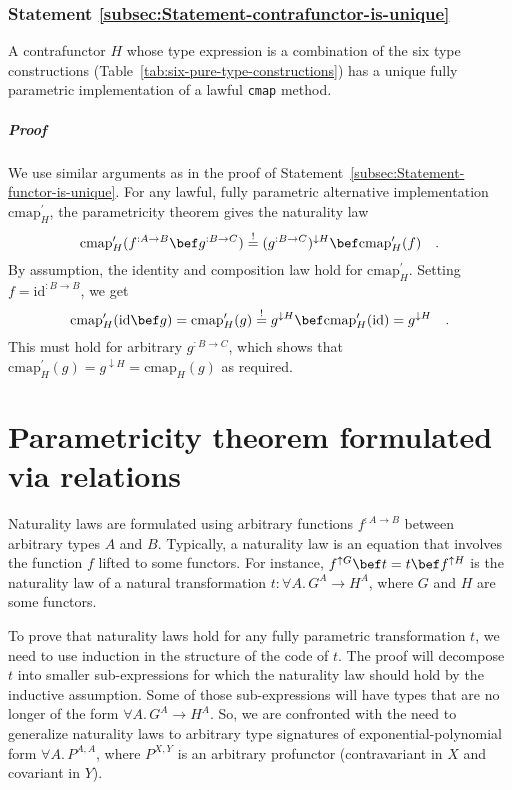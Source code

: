 \subsubsection{Statement \label{subsec:Statement-contrafunctor-is-unique}\ref{subsec:Statement-contrafunctor-is-unique}}

A contrafunctor $H$ whose type expression is a combination of the
six type constructions (Table~\ref{tab:six-pure-type-constructions})
has a unique fully parametric implementation of a lawful \lstinline!cmap!
method. 

\subparagraph{Proof}

We use similar arguments as in the proof of Statement~\ref{subsec:Statement-functor-is-unique}.
For any lawful, fully parametric alternative implementation $\text{cmap}_{H}^{\prime}$,
the parametricity theorem gives the naturality law
\[
\text{cmap}_{H}^{\prime}(f^{:A\rightarrow B}\bef g^{:B\rightarrow C})\overset{!}{=}(g^{:B\rightarrow C})^{\downarrow H}\bef\text{cmap}_{H}^{\prime}(f)\quad.
\]
By assumption, the identity and composition law hold for $\text{cmap}_{H}^{\prime}$.
Setting $f=\text{id}^{:B\rightarrow B}$, we get
\[
\text{cmap}_{H}^{\prime}(\text{id}\bef g)=\text{cmap}_{H}^{\prime}(g)\overset{!}{=}g^{\downarrow H}\bef\text{cmap}_{H}^{\prime}(\text{id})=g^{\downarrow H}\quad.
\]
This must hold for arbitrary $g^{:B\rightarrow C}$, which shows that
$\text{cmap}_{H}^{\prime}(g)=g^{\downarrow H}=\text{cmap}_{H}(g)$
as required.

\section{Parametricity theorem formulated via relations\label{sec:Parametricity-theorem-for-relations}}

Naturality laws are formulated using arbitrary functions $f^{:A\rightarrow B}$
between arbitrary types $A$ and $B$. Typically, a naturality law
is an equation that involves the function $f$ lifted to some functors.
For instance, $f^{\uparrow G}\bef t=t\bef f^{\uparrow H}$ is the
naturality law of a natural transformation $t:\forall A.\,G^{A}\rightarrow H^{A}$,
where $G$ and $H$ are some functors.

To prove that naturality laws hold for any fully parametric transformation
$t$, we need to use induction in the structure of the code of $t$.
The proof will decompose $t$ into smaller sub-expressions for which
the naturality law should hold by the inductive assumption. Some of
those sub-expressions will have types that are no longer of the form
$\forall A.\,G^{A}\rightarrow H^{A}$. So, we are confronted with
the need to generalize naturality laws to arbitrary type signatures
of exponential-polynomial form $\forall A.\,P^{A,A}$, where $P^{X,Y}$
is an arbitrary profunctor (contravariant in $X$ and covariant in
$Y$). 

